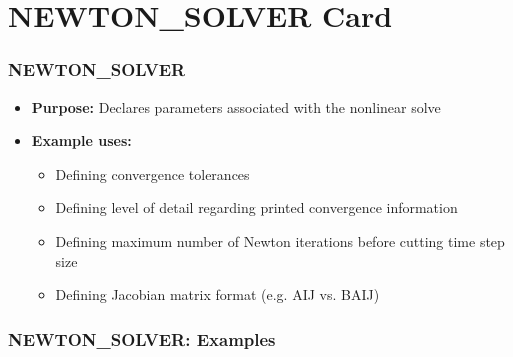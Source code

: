 \section{NEWTON\_SOLVER Card}

\begin{frame}\frametitle{NEWTON\_SOLVER}

\begin{itemize}
\item[] \textbf{Purpose:} Declares parameters associated with the nonlinear solve
\item[] \textbf{Example uses:}
\begin{itemize}
  \item Defining convergence tolerances
  \item Defining level of detail regarding printed convergence information
  \item Defining maximum number of Newton iterations before cutting time step size
  \item Defining Jacobian matrix format (e.g. AIJ vs. BAIJ)
\end{itemize}
\end{itemize}

\end{frame}

\begin{frame}[fragile]\frametitle{NEWTON\_SOLVER: Examples}

\end{frame}
